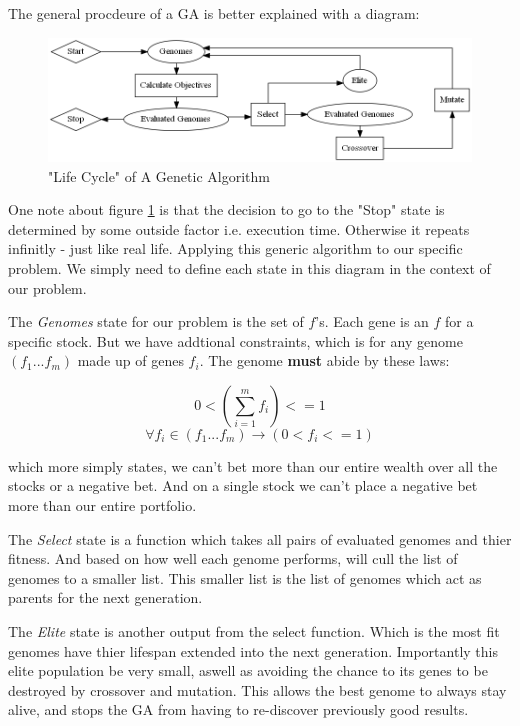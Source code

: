 \documentclass[12pt]{article}
\begin{document}
    The general procdeure of a GA is better explained with a diagram:

    \begin{figure}[h] %
        \centering
        \includegraphics[width=\textwidth]{GA}
        \caption{"Life Cycle" of A Genetic Algorithm}\label{fig:GA}
    \end{figure}

    One note about figure \ref{fig:GA} is that the decision to go to the "Stop"
    state is determined by some outside factor i.e. execution time. Otherwise
    it repeats infinitly - just like real life. Applying this generic algorithm to 
    our specific problem. We simply need to
    define each state in this diagram in the context of our problem.

    The \textit{Genomes} state for our problem is the set of \(f\)'s. Each gene is an
    \(f\) for a specific stock. But we have addtional constraints, which is for 
    any genome \((f_1...f_m)\) made up of genes \(f_i\). The genome \textbf{must}
    abide by these laws:

    \begin{equation*}
        0 < \left(
            \displaystyle\sum^{m}_{i=1} f_i
        \right) <= 1
    \end{equation*}
    \begin{equation*}
        \forall f_i \in (f_1...f_m) \to \left(
            0 < f_i <= 1
        \right)
    \end{equation*}

    which more simply states, we can't bet more than our entire wealth over all the stocks or
    a negative bet. And on a single stock we can't place a negative bet more than our
    entire portfolio.

    The \textit{Select} state is a function which takes all pairs of evaluated genomes
    and thier fitness. And based on how well each genome performs, will cull the
    list of genomes to a smaller list. This smaller list is the list of genomes
    which act as parents for the next generation.

    The \textit{Elite} state is another output from the select function. Which is
    the most fit genomes have thier lifespan extended into the next generation.
    Importantly this elite population be very small, aswell as avoiding the
    chance to its genes to be destroyed by crossover and mutation. \cite{DeJong}
    This allows the best genome to always stay alive, and stops the GA from
    having to re-discover previously good results.
\end{document}
